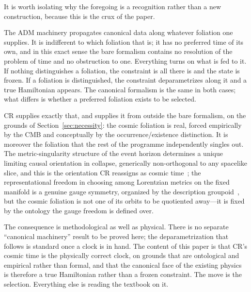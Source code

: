 \documentclass[11pt,a4paper]{article}
\theoremstyle{plain}
\theoremstyle{definition}
\theoremstyle{remark}
\begin{document}
It is worth isolating why the foregoing is a recognition rather than a new construction, because this is the crux of the paper.

The ADM machinery propagates canonical data along whatever foliation one supplies. It is indifferent to which foliation that is; it has no preferred time of its own, and in this exact sense the bare formalism contains no resolution of the problem of time and no obstruction to one. Everything turns on what is fed to it. If nothing distinguishes a foliation, the constraint is all there is and the state is frozen. If a foliation is distinguished, the constraint deparametrizes along it and a true Hamiltonian appears. The canonical formalism is the same in both cases; what differs is whether a preferred foliation exists to be selected.

CR supplies exactly that, and supplies it from outside the bare formalism, on the grounds of Section~\ref{sec:necessity}: the cosmic foliation is real, forced empirically by the CMB and conceptually by the occurrence/existence distinction. It is moreover the foliation that the rest of the programme independently singles out. The metric-singularity structure of the event horizon determines a unique limiting causal orientation in collapse, generically non-orthogonal to any spacelike slice, and this is the orientation CR reassigns as cosmic time~\cite{JanzenBHcausality, JanzenCRframework}; the representational freedom in choosing among Lorentzian metrics on the fixed manifold is a genuine gauge symmetry, organized by the description groupoid~\cite{JanzenGroupoid}, but the cosmic foliation is not one of its orbits to be quotiented away---it is fixed by the ontology the gauge freedom is defined over.

The consequence is methodological as well as physical. There is no separate ``canonical machinery'' result to be proved here; the deparametrization that follows is standard once a clock is in hand. The content of this paper is that CR's cosmic time is the physically correct clock, on grounds that are ontological and empirical rather than formal, and that the canonical face of the existing physics is therefore a true Hamiltonian rather than a frozen constraint. The move is the selection. Everything else is reading the textbook on it.
\end{document}

